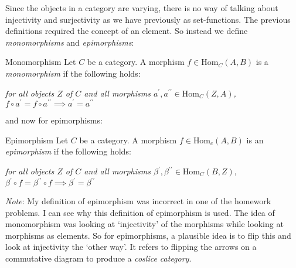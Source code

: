 \documentclass{report}
\begin{document}
Since the objects in a category are varying, there is no way of talking about injectivity and surjectivity as we have previously as set-functions. The previous definitions required the concept of an element. So instead we define \textit{monomorphisms} and \textit{epimorphisms}:

\begin{definition}[\label{def:1.4.7}]{Monomorphism}
    Let $C$ be a category. A morphism $f \in \text{Hom}_{C}(A, B)$ is a \textit{monomorphism} if the following holds:
    \begin{center}
        \textit{for all objects $Z$ of $C$ and all morphisms $a^{\prime}, a^{\prime\prime} \in \text{Hom}_{C}(Z, A)$,} \\
        $f \circ a^{\prime} = f \circ a^{\prime\prime} \implies a^{\prime} = a^{\prime\prime}$
    \end{center}
\end{definition}
and now for epimorphisms:
\begin{definition}[\label{def:1.4.8}]{Epimorphism}
    Let $C$ be a category. A morphism $f \in \text{Hom}_{c}(A, B)$ is an \textit{epimorphism} if the following holds:
        \begin{center}
            \textit{for all objects $Z$ of $C$ and all morphisms $\beta^{\prime}, \beta^{\prime\prime} \in \text{Hom}_{C}(B, Z),$}\\
            $\beta^{\prime} \circ f = \beta^{\prime\prime} \circ f \implies \beta^{\prime} = \beta^{\prime\prime}$
        \end{center}
\end{definition}
\textit{Note}: My definition of epimorphism was incorrect in one of the homework problems. I can see why this definition of epimorphism is used. The idea of monomorphism was looking at `injectivity' of the morphisms while looking at morphisms as elements. So for epimorphisms, a plausible idea is to flip this and look at injectivity the `other way'. It refers to flipping the arrows on a commutative diagram to produce a \textit{coslice category}.
\end{document}
